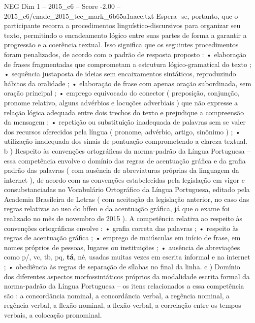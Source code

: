 \begin{textsample}{NEG Dim 1 – 2015\_c6 – Score -2.00 – 2015\_c6/enade\_2015\_tec\_mark\_6b65a1aace.txt}
Espera -se, portanto, que o participante recorra a procedimentos linguístico-discursivos para organizar seu texto, permitindo o encadeamento lógico entre suas partes de forma a garantir a progressão e a coerência textual.
Isso significa que os seguintes procedimentos foram penalizados, de acordo com o padrão de resposta proposto : • elaboração de frases fragmentadas que comprometam a estrutura lógico-gramatical do texto ; • sequência justaposta de ideias sem encaixamentos sintáticos, reproduzindo hábitos da oralidade ; • elaboração de frase com apenas oração subordinada, sem oração principal ; • emprego equivocado do conector ( preposição, conjunção, pronome relativo, alguns advérbios e locuções adverbiais ) que não expresse a relação lógica adequada entre dois trechos do texto e prejudique a compreensão da mensagem ; • repetição ou substituição inadequada de palavras sem se valer dos recursos oferecidos pela língua ( pronome, advérbio, artigo, sinônimo ) ; • utilização inadequada dos sinais de pontuação comprometendo a clareza textual. b ) Respeito às convenções ortográficas da norma-padrão da Língua Portuguesa – essa competência envolve o domínio das regras de acentuação gráfica e da grafia padrão das palavras ( com ausência de abreviaturas próprias da linguagem da internet ), de acordo com as convenções estabelecidas pela legislação em vigor e consubstanciadas no Vocabulário Ortográfico da Língua Portuguesa, editado pela Academia Brasileira de Letras ( com aceitação da legislação anterior, no caso das regras relativas ao uso do hífen e da acentuação gráfica, já que o exame foi realizado no mês de novembro de 2015 ).
A competência relativa ao respeito às convenções ortográficas envolve : • grafia correta das palavras ; • respeito às regras de acentuação gráfica ; • emprego de maiúsculas em início de frase, em nomes próprios de pessoas, lugares ou instituições ; • ausência de abreviações como p/, vc, tb, pq, \textbf{tá}, né, usadas muitas vezes em escrita informal e na internet ; • obediência às regras de separação de sílabas no final da linha. c ) Domínio dos diferentes aspectos morfossintáticos próprios da modalidade escrita formal da norma-padrão da Língua Portuguesa – os itens relacionados a essa competência são : a concordância nominal, a concordância verbal, a regência nominal, a regência verbal, a flexão nominal, a flexão verbal, a correlação entre os tempos verbais, a colocação pronominal.

\end{textsample}
